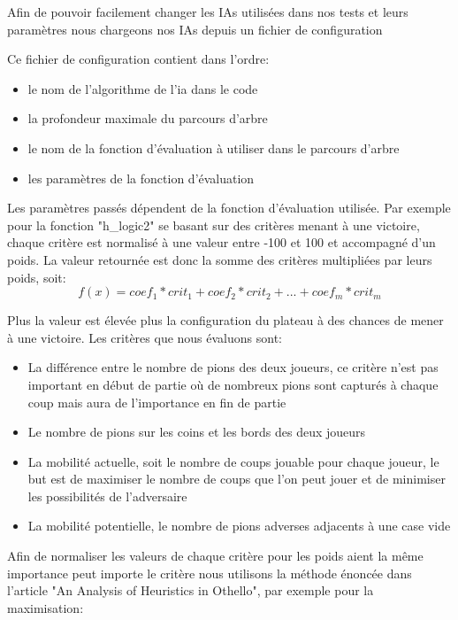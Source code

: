 \documentclass[12pt]{article}
\begin{document}
Afin de pouvoir facilement changer les IAs utilisées dans nos tests et leurs paramètres nous chargeons nos IAs depuis un fichier de configuration

Ce fichier de configuration contient dans l'ordre:
\begin{itemize}
\item le nom de l'algorithme de l'ia dans le code
\item la profondeur maximale du parcours d'arbre
\item le nom de la fonction d'évaluation à utiliser dans le parcours d'arbre
\item les paramètres de la fonction d'évaluation
\end{itemize}

Les paramètres passés dépendent de la fonction d'évaluation utilisée. Par exemple pour la fonction "h\_logic2" se basant sur des critères menant à une victoire, chaque critère est normalisé à une valeur entre -100 et 100 et accompagné d'un poids. La valeur retournée est donc la somme des critères multipliées par leurs poids, soit:
\begin{equation}
   f(x) = coef_{1}*crit_{1} + coef_{2}*crit_{2} + ... + coef_{m}*crit_{m}
\end{equation}

Plus la valeur est élevée plus la configuration du plateau à des chances de mener à une victoire. Les critères que nous évaluons sont:
\begin{itemize}
\item La différence entre le nombre de pions des deux joueurs, ce critère n'est pas important en début de partie où de nombreux pions sont capturés à chaque coup mais aura de l'importance en fin de partie
\item Le nombre de pions sur les coins et les bords des deux joueurs
\item La mobilité actuelle, soit le nombre de coups jouable pour chaque joueur, le but est de maximiser le nombre de coups que l'on peut jouer et de minimiser les possibilités de l'adversaire
\item La mobilité potentielle, le nombre de pions adverses adjacents à une case vide
\end{itemize}

Afin de normaliser les valeurs de chaque critère pour les poids aient la même importance peut importe le critère nous utilisons la méthode énoncée dans l'article "An Analysis of Heuristics in Othello"\cite{heuristic_othello}, par exemple pour la maximisation:
\end{document}

